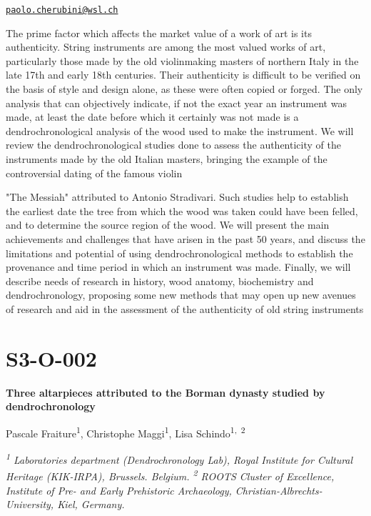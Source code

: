 \documentclass[
]{book}
\begin{document}
\href{mailto:paolo.cherubini@wsl.ch}{\nolinkurl{paolo.cherubini@wsl.ch}}

The prime factor which affects the market value of a work of art is its authenticity. String instruments are among the most valued works of art, particularly those made by the old violinmaking masters of northern Italy in the late 17th and early 18th centuries. Their authenticity is difficult to be verified on the basis of style and design alone, as these were often copied or forged. The only analysis that can objectively indicate, if not the exact year an instrument was made, at least the date before which it certainly was not made is a dendrochronological analysis of the wood used to make the instrument. We will review the dendrochronological studies done to assess the authenticity of the instruments made by the old Italian masters, bringing the example of the controversial dating of the famous violin

"The Messiah" attributed to Antonio Stradivari. Such studies help to establish the earliest date the tree from which the wood was taken could have been felled, and to determine the source region of the wood. We will present the main achievements and challenges that have arisen in the past 50 years, and discuss the limitations and potential of using dendrochronological methods to establish the provenance and time period in which an instrument was made. Finally, we will describe needs of research in history, wood anatomy, biochemistry and dendrochronology, proposing some new methods that may open up new avenues of research and aid in the assessment of the authenticity of old string instruments

\hypertarget{s3-o-002}{%
\section*{S3-O-002}\label{s3-o-002}}

\textbf{Three altarpieces attributed to the Borman dynasty studied by dendrochronology}

Pascale Fraiture\textsuperscript{1}, Christophe Maggi\textsuperscript{1}, Lisa Schindo\textsuperscript{1,~2}

\emph{\textsuperscript{1} Laboratories department (Dendrochronology Lab), Royal Institute for Cultural Heritage (KIK-IRPA), Brussels. Belgium. \textsuperscript{2} ROOTS Cluster of Excellence, Institute of Pre- and Early Prehistoric Archaeology, Christian-Albrechts-University, Kiel, Germany.}
\end{document}
